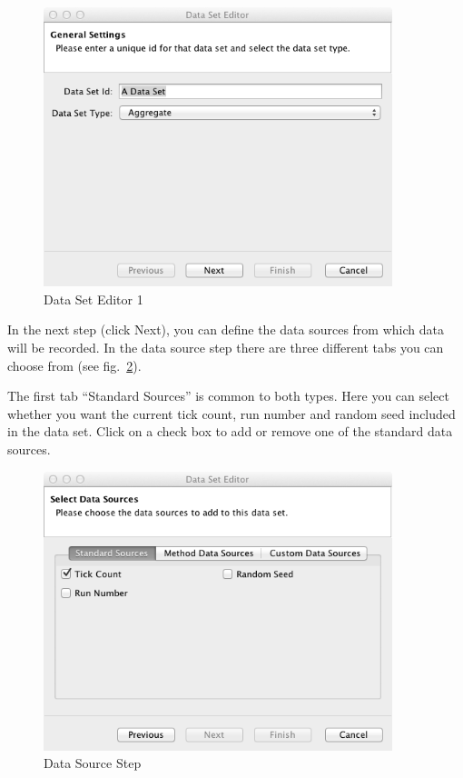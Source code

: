 \documentclass[11pt]{amsart}
\begin{document}
\begin{figure}[h]
\begin{center}
\vspace{.2in}
\centerline {
\includegraphics[width=4in]{images/ds_wizard_1.png}
}
\caption{Data Set Editor 1}
\label{fig:ds1}
\end{center}
\end{figure}

In the next step (click Next), you can define the data sources from which data will be recorded. In the data source step there are three different tabs you can choose from (see fig.~\ref{fig:ds2}).

The first tab ``Standard Sources'' is common to both types. Here you can select whether you want the current tick count, run number and random seed included in the data set. Click on a check box to add or remove one of the standard data sources.

\begin{figure}[h]
\begin{center}
\vspace{.2in}
\centerline {
\includegraphics[width=4in]{images/ds_wizard_2.png}
}
\caption{Data Source Step}
\label{fig:ds2}
\end{center}
\end{figure}
\end{document}
